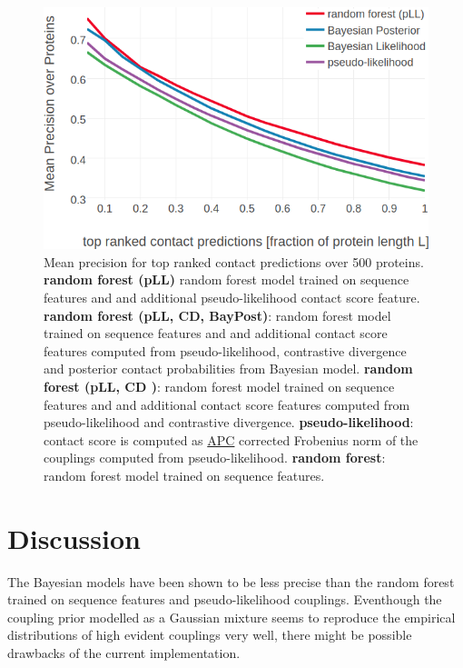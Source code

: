 \documentclass[11pt,a4paper,twoside]{book}
\theoremstyle{definition}
\theoremstyle{definition}
\theoremstyle{remark}
\begin{document}
\begin{figure}

{\centering \includegraphics[width=0.9\linewidth]{img/bayesian_model/benchmark/precision_vs_rank_pll_3comp_300k_likelihood} 

}

\caption{Mean precision for top ranked
contact predictions over 500 proteins. \textbf{random forest (pLL)}
random forest model trained on sequence features and and additional
pseudo-likelihood contact score feature. \textbf{random forest (pLL, CD,
BayPost)}: random forest model trained on sequence features and and
additional contact score features computed from pseudo-likelihood,
contrastive divergence and posterior contact probabilities from Bayesian
model. \textbf{random forest (pLL, CD )}: random forest model trained on
sequence features and and additional contact score features computed
from pseudo-likelihood and contrastive divergence.
\textbf{pseudo-likelihood}: contact score is computed as
\protect\hyperlink{abbrev}{APC} corrected Frobenius norm of the
couplings computed from pseudo-likelihood. \textbf{random forest}:
random forest model trained on sequence features.}\label{fig:precision-rf-bayesian}
\end{figure}

\section{Discussion}\label{discussion-3}

The Bayesian models have been shown to be less precise than the random
forest trained on sequence features and pseudo-likelihood couplings.
Eventhough the coupling prior modelled as a Gaussian mixture seems to
reproduce the empirical distributions of high evident couplings very
well, there might be possible drawbacks of the current implementation.
\end{document}
